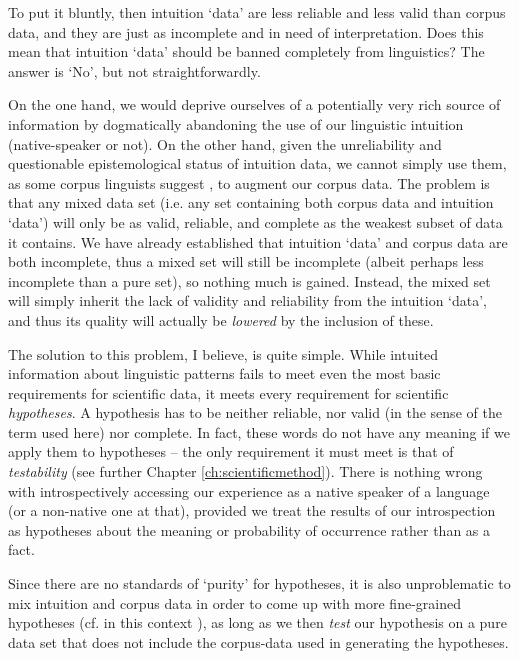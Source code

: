 To put it bluntly, then intuition `data' are less reliable and less valid than corpus data, and they are just as incomplete and in need of interpretation. Does this mean that intuition `data' should be banned completely from linguistics? The answer is `No', but not straightforwardly.

On the one hand, we would deprive ourselves of a potentially very rich source of information by dogmatically abandoning the use of our linguistic intuition (native-speaker or not). On the other hand, given the unreliability and questionable epistemological status of intuition data, we cannot simply use them, as some corpus linguists suggest \citep[e.g.][19]{mcenery_corpus_2001}, to augment our corpus data. The problem is that any mixed data set (i.e. any set containing both corpus data and intuition `data') will only be as valid, reliable, and complete as the weakest subset of data it contains. We have already established that intuition `data' and corpus data are both incomplete, thus a mixed set will still be incomplete (albeit perhaps less incomplete than a pure set), so nothing much is gained. Instead, the mixed set will simply inherit the lack of validity and reliability from the intuition `data', and thus its quality will actually be \emph{lowered} by the inclusion of these.

The solution to this problem, I believe, is quite simple. While intuited information about linguistic patterns fails to meet even the most basic requirements for scientific data, it meets every requirement for scientific \emph{hypotheses}. A hypothesis has to be neither reliable, nor valid (in the sense of the term used here) nor complete. In fact, these words do not have any meaning if we apply them to hypotheses -- the only requirement it must meet is that of \emph{testability} (see further Chapter \ref{ch:scientificmethod}). There is nothing wrong with introspectively accessing our experience as a native speaker of a language (or a non-native one at that), provided we treat the results of our introspection as hypotheses about the meaning or probability of occurrence rather than as a fact.

Since there are no standards of `purity' for hypotheses, it is also unproblematic to mix intuition and corpus data in order to come up with more fine-grained hypotheses (cf. in this context \citealt[143]{aston_bnc_1998}), as long as we then \emph{test} our hypothesis on a pure data set that does not include the corpus-data used in generating the hypotheses.

